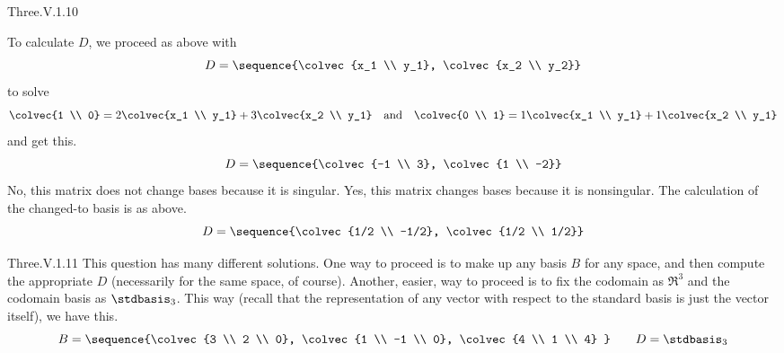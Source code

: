 \begin{ans}{Three.V.1.10}
\begin{exparts}
          To calculate $D$, we proceed as above with
          \begin{equation*}
            D=\sequence{\colvec{x_1 \\ y_1},
                        \colvec{x_2 \\ y_2}}
          \end{equation*}
          to solve
          \begin{equation*}
            \colvec{1 \\ 0}
            =2\colvec{x_1 \\ y_1}+3\colvec{x_2 \\ y_1}
            \quad\text{and}\quad
            \colvec{0 \\ 1}
            =1\colvec{x_1 \\ y_1}+1\colvec{x_2 \\ y_1}
          \end{equation*}
          and get this.
          \begin{equation*}
            D=\sequence{\colvec{-1 \\ 3},
                        \colvec{1 \\ -2}}
          \end{equation*}
        \partsitem No, this matrix does not change bases because it
           is singular.
        \partsitem Yes, this matrix changes bases because it is nonsingular.
          The calculation of the changed-to basis is as above.
          \begin{equation*}
            D=\sequence{\colvec{1/2 \\ -1/2},
                        \colvec{1/2 \\ 1/2}}
          \end{equation*}
      \end{exparts}
    
\end{ans}
\begin{ans}{Three.V.1.11}
      This question has many different solutions.
      One way to proceed is to make up any basis $B$ for any space,
      and then compute the appropriate $D$ (necessarily for the same space,
      of course).
      Another, easier, way to proceed is to fix the codomain as $\Re^3$ and
      the codomain basis as $\stdbasis_3$.
      This way (recall that the representation of any vector with respect
      to the standard basis is just the vector itself),
      we have this.
      \begin{equation*}
        B=\sequence{\colvec{3 \\ 2 \\ 0},
                    \colvec{1 \\ -1 \\ 0},
                    \colvec{4 \\ 1 \\ 4}  }
        \qquad
        D=\stdbasis_3
      \end{equation*}
    
\end{ans}
